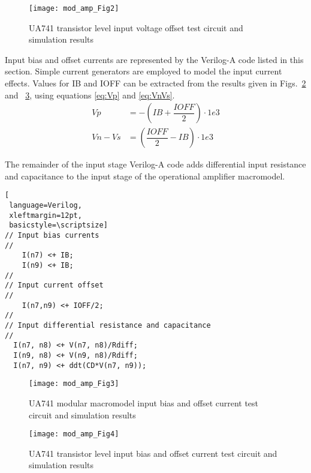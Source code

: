 \begin{figure} [here]
  \centering
  \texttt{[image: mod\_amp\_Fig2]} 
  \caption{UA741 transistor level input voltage offset test circuit and simulation results}
  \label{fig:mod_amp2}
\end{figure} 





Input bias and offset currents are represented by the Verilog-A code
listed in this section. Simple current generators are employed to
model the input current effects. Values for IB and IOFF can be
extracted from the results given in Figs.~\ref{fig:mod_amp3} and
~\ref{fig:mod_amp4}, using equations \eqref{eq:Vp} and
\eqref{eq:VnVs}.
\begin{align}
\label{eq:Vp}
Vp&=-\left(IB+\dfrac{IOFF}{2}\right)\cdot 1e3\\
\label{eq:VnVs}
Vn-Vs &= \left(\dfrac{IOFF}{2}-IB\right)\cdot 1e3
\end{align}

 The remainder of the input stage Verilog-A code adds differential
 input resistance and capacitance to the input stage of the
 operational amplifier macromodel.

\begin{lstlisting}[
 language=Verilog, 
 xleftmargin=12pt,
 basicstyle=\scriptsize]
// Input bias currents
//
    I(n7) <+ IB;
    I(n9) <+ IB;
//
// Input current offset
//
    I(n7,n9) <+ IOFF/2;
//
// Input differential resistance and capacitance
//
  I(n7, n8) <+ V(n7, n8)/Rdiff;
  I(n9, n8) <+ V(n9, n8)/Rdiff;
  I(n7, n9) <+ ddt(CD*V(n7, n9));
\end{lstlisting}

\begin{figure} [here]
  \centering
  \texttt{[image: mod\_amp\_Fig3]}
  \caption{UA741 modular macromodel input bias and offset current test circuit and simulation results}
  \label{fig:mod_amp3}
\end{figure} 

\begin{figure} [here]
  \centering
  \texttt{[image: mod\_amp\_Fig4]}
  \caption{UA741 transistor level input bias and offset current test circuit and simulation results}
  \label{fig:mod_amp4}
\end{figure} 




